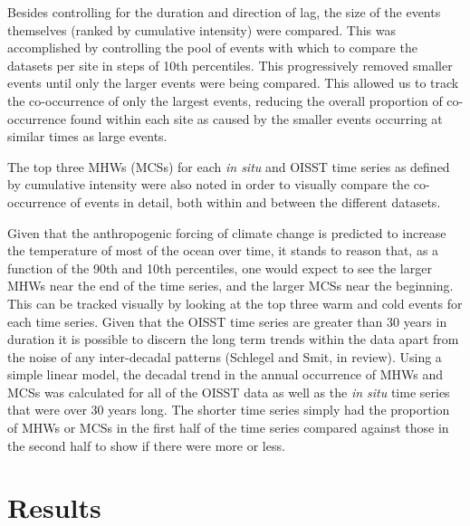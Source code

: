 \documentclass[a4paper,10pt,review]{elsarticle}
\begin{document}
Besides controlling for the duration and direction of lag, the size of the events themselves (ranked by cumulative intensity) were compared. This was accomplished by controlling the pool of events with which to compare the datasets per site in steps of 10th percentiles. This progressively removed smaller events until only the larger events were being compared. This allowed us to track the co-occurrence of only the largest events, reducing the overall proportion of co-occurrence found within each site as caused by the smaller events occurring at similar times as large events.

The top three MHWs (MCSs) for each \emph{in situ} and OISST time series as defined by cumulative intensity were also noted in order to visually compare the co-occurrence of events in detail, both within and between the different datasets.

Given that the anthropogenic forcing of climate change is predicted to increase the temperature of most of the ocean over time, it stands to reason that, as a function of the 90th and 10th percentiles, one would expect to see the larger MHWs near the end of the time series, and the larger MCSs near the beginning. This can be tracked visually by looking at the top three warm and cold events for each time series. Given that the OISST time series are greater than 30 years in duration it is possible to discern the long term trends within the data apart from the noise of any inter-decadal patterns (Schlegel and Smit, in review). Using a simple linear model, the decadal trend in the annual occurrence of MHWs and MCSs was calculated for all of the OISST data as well as the \emph{in situ} time series that were over 30 years long. The shorter time series simply had the proportion of MHWs or MCSs in the first half of the time series compared against those in the second half to show if there were more or less.

\section{Results}
\end{document}
